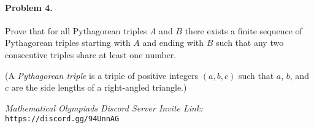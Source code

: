 \documentclass[11pt]{article}
\begin{document}
	\paragraph{Problem 4.} Prove that for all Pythagorean triples \(A\) and \(B\) there exists a finite sequence of Pythagorean triples starting with \(A\) and ending with \(B\) such that any two consecutive triples share at least one number.
	
	(A \emph{Pythagorean triple} is a triple of positive integers \((a, b, c)\) such that \(a\), \(b\), and \(c\) are the side lengths of a right-angled triangle.)
	
	\vfill
	
	\noindent \makebox[\linewidth]{\rule{\textwidth}{0.4pt}}	
	
	\noindent \textit{Mathematical Olympiads Discord Server Invite Link:} \texttt{https://discord.gg/94UnnAG}
		
		
		
		
	
	
\end{document}
